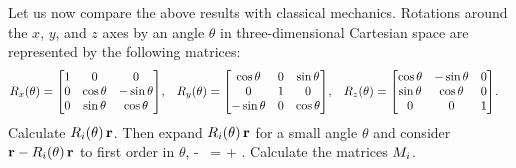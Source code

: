 \begin{problem}
	Let us now compare the above results with classical mechanics.  Rotations around the $x$, $y$, and $z$ axes by an angle $\theta$ in three-dimensional Cartesian space are represented by the following matrices:
	\begin{align*}
		\Rxt &= \mqty[ 1 & 0 & 0 \\ 0 & \cost & -\sint \\ 0 & \sint & \cost ], &
		\Ryt &= \mqty[ \cost & 0 & \sint \\ 0 & 1 & 0 \\ -\sint & 0 & \cost ], &
		\Rzt &= \mqty[ \cost & -\sint & 0 \\ \sint & \cost & 0 \\ 0 & 0 & 1 ].
	\end{align*}
	Calculate $R_i(\theta) \, \mathbf{r}$.  Then expand $R_i(\theta) \, \mathbf{r}$ for a small angle $\theta$ and consider $\mathbf{r} - R_i(\theta) \, \mathbf{r}$ to first order in $\theta$,
	\beq
		\vr - \Rit \, \vr = \theta \Mi \vr + .
	\eeq
	Calculate the matrices $M_i$.
\end{problem}

